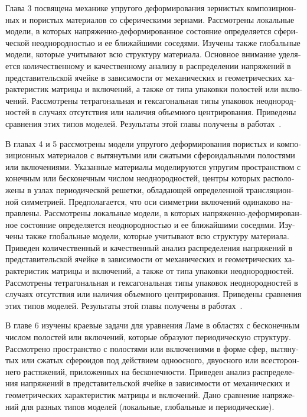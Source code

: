 \begin{russian}
Глава 3 посвящена механике упругого деформирования зернистых композиционных и пористых материалов со сферическими зернами. Рассмотрены локальные модели, в которых напряженно-деформированное состояние определяется сферической неоднородностью и ее ближайшими соседями. Изучены также глобальные модели, которые учитывают всю структуру материала. Основное внимание уделяется количественному и качественному анализу в распределении напряжений в представительской ячейке в зависимости от механических и геометрических характеристик матрицы и включений, а также от типа упаковки полостей или включений. Рассмотрены тетрагональная и гексагональная типы упаковок неоднородностей в случаях отсутствия или наличия объемного центрирования.
Приведены сравнения этих типов моделей. Результаты этой главы получены в работах~\cite{Nikolaev2012, Nikolaev2014-2, Nikolaev2014-5, Nikolaev2014-7}.

В главах 4 и 5 рассмотрены модели упругого деформирования пористых и композиционных материалов с вытянутыми или сжатыми сфероидальными полостями или включениями. Указанные материалы моделируются упругим пространством с конечным или бесконечным числом неоднородностей, центры которых расположены в узлах периодической решетки, обладающей определенной трансляционной симметрией. Предполагается, что оси симметрии включений одинаково направлены. Рассмотрены локальные модели, в которых напряженно-деформированное состояние определяется неоднородностью и ее ближайшими соседями. Изучены также глобальные модели, которые учитывают всю структуру материала. Приведен количественный и качественный анализ распределения напряжений в представительской ячейке в зависимости от механических и геометрических характеристик матрицы и включений, а также от типа упаковки неоднородностей. Рассмотрены тетрагональная и гексагональная типы упаковок неоднородностей в случаях отсутствия или наличия объемного центрирования.
Приведены сравнения этих типов моделей. Результаты этой главы получены в работах~\cite{Nikolaev2010, Nikolaev-Tanchik2012, Nikolaev2013, Nikolaev2014-1, Nikolaev2014-9, Nikolaev2014-3, Nikolaev2014-4, Nikolaev2014-6}.

В главе 6 изучены краевые задачи для уравнения Ламе в областях с бесконечным числом полостей или включений, которые образуют периодическую структуру. Рассмотрено пространство с полостями или включениями в форме сфер, вытянутых или сжатых сфероидов под действием одноосного, двуосного или всестороннего растяжений, приложенных на бесконечности. Приведен анализ распределения напряжений в представительской ячейке в зависимости от механических и геометрических характеристик матрицы и включений. Дано сравнение напряжений для разных типов моделей (локальные, глобальные и периодические).


\end{russian}
